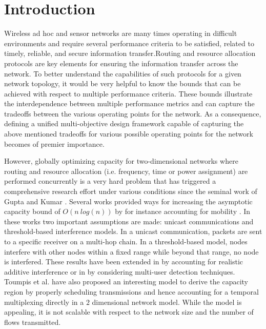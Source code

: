 \documentclass[a4paper]{article}
\begin{document}
\makeRR   



\section{Introduction}\label{sec:introduction}
Wireless ad hoc and sensor networks are many times operating in difficult environments and require several performance criteria to be satisfied, related to timely, reliable, and secure information transfer.Routing and resource allocation protocols are key elements  for ensuring the information transfer across the network.
To better understand the capabilities of such protocols for a given network topology, it would be very helpful to know the bounds that can be achieved with respect to multiple performance criteria. These bounds illustrate the interdependence between multiple performance metrics and can capture the tradeoffs between the various operating points for the network. As a consequence, defining a unified multi-objective design framework capable of capturing the above mentioned tradeoffs for various possible operating points for the network becomes of premier importance.

However, globally optimizing capacity for two-dimensional networks where routing and resource allocation (i.e. frequency, time or power assignment) are performed concurrently is a very hard problem that has triggered a comprehensive research effort under various conditions since the seminal work of Gupta and Kumar \cite{Gupta2000}. Several works provided ways for increasing the asymptotic capacity bound of $O(n~log(n))$ \cite{Gupta2000,Wang2008} by for instance accounting for mobility \cite{Grossglauser2002}.
In these works two important assumptions are made: unicast communications and threshold-based interference models.
In a unicast communication, packets are sent to a specific receiver on a multi-hop chain. In a threshold-based model, nodes interfere with other nodes within a fixed range while beyond that range, no node is interfered. 
These results have been extended in \cite{Mhatre2009} by accounting for realistic additive interference or in \cite{Comaniciu2006} by considering multi-user detection techniques. 
Toumpis et al. \cite{toumpis2003} have also proposed an interesting model to derive the capacity region by properly scheduling transmissions and hence accounting for a temporal multiplexing directly in a $2$ dimensional network model. While the model is appealing, it is not scalable with respect to the network size and the number of flows transmitted.
\end{document}
